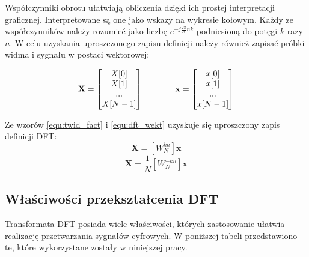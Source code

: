 Współczynniki obrotu ułatwiają obliczenia dzięki ich prostej interpretacji graficznej. Interpretowane są one jako wskazy na wykresie kołowym. Każdy ze współczynników należy rozumieć jako liczbę $e^{-j\frac{2\pi}{N}nk}$ podniesioną do potęgi $k$ razy $n$. W celu uzyskania uproszczonego zapisu definicji należy również zapisać próbki widma i sygnału w postaci wektorowej:

\begin{equation} \label{equ:dft_wekt}
\openup\jot
\begin{aligned}[t]
\mathbf{X} = 
\begin{bmatrix} 
X[0] \\ X[1] \\ ... \\ X[N-1]
\end{bmatrix}
\end{aligned}
\qquad\qquad %
\begin{aligned}[t]
\mathbf{x} =  
\begin{bmatrix} 
x[0] \\ x[1] \\ ... \\ x[N-1]
\end{bmatrix}
\end{aligned}
\end{equation}

Ze wzorów \ref{equ:twid_fact} i \ref{equ:dft_wekt} uzyskuje się uproszczony zapis definicji DFT:
\begin{equation} \label{equ:dft_upr}
	\mathbf{X} = [W_{N}^{kn}]\mathbf{x}
\end{equation}
\begin{equation} \label{equ:idft_upr}
\mathbf{X} = \frac{1}{N}[W_{N}^{-kn}]\mathbf{x}
\end{equation}

\subsection{Właściwości przekształcenia DFT}
Transformata DFT posiada wiele właściwości, których zastosowanie ułatwia realizację przetwarzania sygnałów cyfrowych. W poniższej tabeli przedstawiono te, które wykorzystane zostały w niniejszej pracy.

